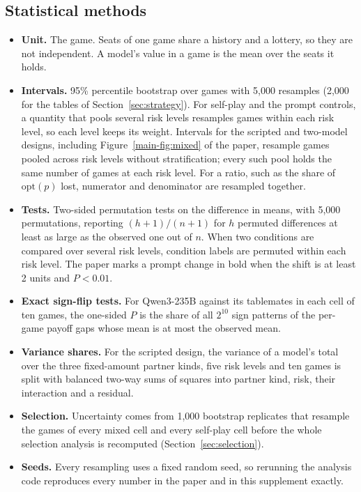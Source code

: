 \documentclass[10pt]{article}
\let\plainsubsection\subsection
\renewcommand{\subsection}{\FloatBarrier\needspace{8\baselineskip}\plainsubsection}
\begin{document}
\begin{table}[h]
\caption{The ten lottery draws. A missed game ends in catastrophe when its risk $p$ exceeds the draw; the third column gives the risk levels of the self-play grid at which that happens. The last three columns count missed games in the self-play grid by repetition, and the catastrophes realised and expected (the sum of $p$ over those games).}
\label{tab:lottery}
\centering\small

\end{table}

\subsection{Statistical methods}
\label{sec:stats}

\begin{itemize}
\item \textbf{Unit.} The game. Seats of one game share a history and a lottery, so they are not independent. A model's value in a game is the mean over the seats it holds.
\item \textbf{Intervals.} 95\% percentile bootstrap over games with 5,000 resamples (2,000 for the tables of Section~\ref{sec:strategy}). For self-play and the prompt controls, a quantity that pools several risk levels resamples games within each risk level, so each level keeps its weight. Intervals for the scripted and two-model designs, including Figure~\ref{main-fig:mixed} of the paper, resample games pooled across risk levels without stratification; every such pool holds the same number of games at each risk level. For a ratio, such as the share of $\mathrm{opt}(p)$ lost, numerator and denominator are resampled together.
\item \textbf{Tests.} Two-sided permutation tests on the difference in means, with 5,000 permutations, reporting $(h+1)/(n+1)$ for $h$ permuted differences at least as large as the observed one out of $n$. When two conditions are compared over several risk levels, condition labels are permuted within each risk level. The paper marks a prompt change in bold when the shift is at least 2 units and $P<0.01$.
\item \textbf{Exact sign-flip tests.} For Qwen3-235B against its tablemates in each cell of ten games, the one-sided $P$ is the share of all $2^{10}$ sign patterns of the per-game payoff gaps whose mean is at most the observed mean.
\item \textbf{Variance shares.} For the scripted design, the variance of a model's total over the three fixed-amount partner kinds, five risk levels and ten games is split with balanced two-way sums of squares into partner kind, risk, their interaction and a residual.
\item \textbf{Selection.} Uncertainty comes from 1,000 bootstrap replicates that resample the games of every mixed cell and every self-play cell before the whole selection analysis is recomputed (Section~\ref{sec:selection}).
\item \textbf{Seeds.} Every resampling uses a fixed random seed, so rerunning the analysis code reproduces every number in the paper and in this supplement exactly.
\end{itemize}
\end{document}
